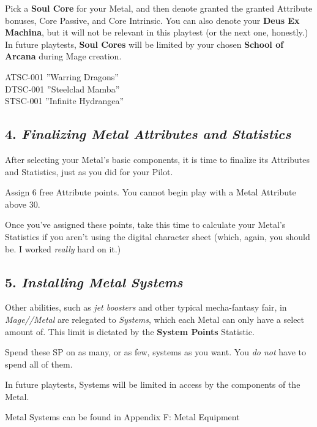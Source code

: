 \documentclass[
]{article}
\begin{document}
Pick a \textbf{Soul Core} for your Metal, and then denote granted the
granted Attribute bonuses, Core Passive, and Core Intrinsic. You can
also denote your \textbf{Deus Ex Machina}, but it will not be relevant
in this playtest (or the next one, honestly.) In future playtests,
\textbf{Soul Cores} will be limited by your chosen \textbf{School of
Arcana} during Mage creation.

{ATSC-001 ''Warring Dragons''}\\
{DTSC-001 ''Steelclad Mamba''}\\
{STSC-001 ''Infinite Hydrangea''}

\hypertarget{finalizing-metal-attributes-and-statistics}{%
\subsection{\texorpdfstring{4. \emph{Finalizing Metal Attributes and
Statistics}}{4. Finalizing Metal Attributes and Statistics}}\label{finalizing-metal-attributes-and-statistics}}

After selecting your Metal's basic components, it is time to finalize
its Attributes and Statistics, just as you did for your Pilot.

Assign 6 free Attribute points. You cannot begin play with a Metal
Attribute above 30.

Once you've assigned these points, take this time to calculate your
Metal's Statistics if you aren't using the digital character sheet
(which, again, you should be. I worked \emph{really} hard on it.)

\hypertarget{installing-metal-systems}{%
\subsection{\texorpdfstring{5. \emph{Installing Metal
Systems}}{5. Installing Metal Systems}}\label{installing-metal-systems}}

Other abilities, such as \emph{jet boosters} and other typical
mecha-fantasy fair, in {{\emph{Mage//Metal}}} are relegated to
\emph{Systems}, which each Metal can only have a select amount of. This
limit is dictated by the \textbf{System Points} Statistic.

Spend these SP on as many, or as few, systems as you want. You \emph{do
not} have to spend all of them.

In future playtests, Systems will be limited in access by the components
of the Metal.

Metal Systems can be found in Appendix F: Metal Equipment
\end{document}
